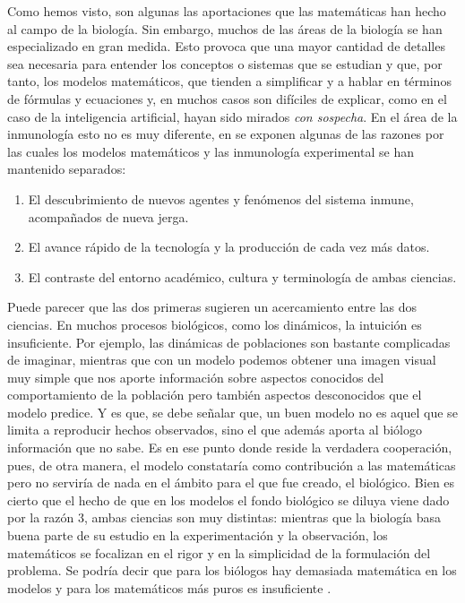 Como hemos visto, son algunas las aportaciones que las matemáticas han hecho al campo de la biología. Sin embargo, muchos de las áreas de la biología se han especializado en gran medida. Esto provoca que una mayor cantidad de detalles sea necesaria para entender los conceptos o sistemas que se estudian y que, por tanto, los modelos matemáticos, que tienden a simplificar y a hablar en términos de fórmulas y ecuaciones y, en muchos casos son difíciles de explicar, como en el caso de la inteligencia artificial, hayan sido mirados \textit{con sospecha}. En el área de la inmunología esto no es muy diferente, en \cite{mathsModInmu} se exponen algunas de las razones por las cuales los modelos matemáticos y las inmunología experimental se han mantenido separados:

\begin{enumerate}
	\item El descubrimiento de nuevos agentes y fenómenos del sistema inmune, acompañados de nueva jerga.
	
	\item El avance rápido de la tecnología y la producción de cada vez más datos.
	
	\item El contraste del entorno académico, cultura y terminología de ambas ciencias.
\end{enumerate}

Puede parecer que las dos primeras sugieren un acercamiento entre las dos ciencias. En muchos procesos biológicos, como los dinámicos, la intuición es insuficiente. Por ejemplo, las dinámicas de poblaciones son bastante complicadas de imaginar, mientras que con un modelo podemos obtener una imagen visual muy simple que nos aporte información sobre aspectos conocidos del comportamiento de la población pero también aspectos desconocidos que el modelo predice. Y es que, se debe señalar que, un buen modelo no es aquel que se limita a reproducir hechos observados, sino el que además aporta al biólogo información que no sabe. Es en ese punto donde reside la verdadera cooperación, pues, de otra manera, el modelo constataría como contribución a las matemáticas pero no serviría de nada en el ámbito para el que fue creado, el biológico. Bien es cierto que el hecho de que en los modelos el fondo biológico se diluya viene dado por la razón 3, ambas ciencias son muy distintas: mientras que la biología basa buena parte de su estudio en la experimentación y la observación, los matemáticos se focalizan en el rigor y en la simplicidad de la formulación del problema. Se podría decir que para los biólogos hay demasiada matemática en los modelos y para los matemáticos más puros es insuficiente \citep{RoleOfM}.

